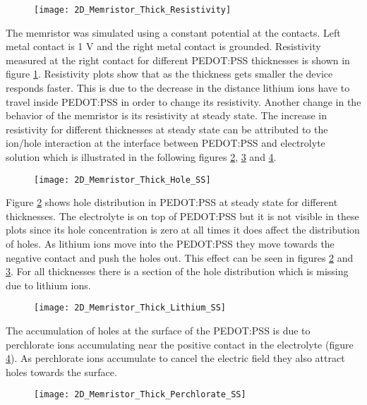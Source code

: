 \begin{doublespace}
\begin{figure}[!htp]
\centering
\texttt{[image: 2D\_Memristor\_Thick\_Resistivity]}
\caption{} 
\label{thick_resistivity}
\end{figure}

The memristor was simulated using a constant potential at the contacts. Left metal contact is 1 V and the right metal contact is grounded. Resistivity measured at the right contact for different PEDOT:PSS thicknesses is shown in figure \ref{thick_resistivity}. Resistivity plots show that as the thickness gets smaller the device responds faster. This is due to the decrease in the distance lithium ions have to travel inside PEDOT:PSS in order to change its resistivity. Another change in the behavior of the memristor is its resistivity at steady state. The increase in resistivity for different thicknesses at steady state can be attributed to the ion/hole interaction at the interface between PEDOT:PSS and electrolyte solution which is illustrated in the following figures \ref{thick_p_ss}, \ref{thick_li_ss} and \ref{thick_perch_ss}.

\begin{figure}[!htp]
\centering
\texttt{[image: 2D\_Memristor\_Thick\_Hole\_SS]}
\caption{} 
\label{thick_p_ss}
\end{figure}


Figure \ref{thick_p_ss} shows hole distribution in PEDOT:PSS at steady state for different thicknesses. The electrolyte is on top of PEDOT:PSS but it is not visible in these plots since its hole concentration is zero at all times it does affect the distribution of holes. As lithium ions move into the PEDOT:PSS they move towards the negative contact and push the holes out. This effect can be seen in figures \ref{thick_p_ss} and  \ref{thick_li_ss}. For all thicknesses there is a section of the hole distribution which is missing due to lithium ions.

\begin{figure}[!htp]
\centering
\texttt{[image: 2D\_Memristor\_Thick\_Lithium\_SS]}
\caption{} 
\label{thick_li_ss}
\end{figure}

The accumulation of holes at the surface of the PEDOT:PSS is due to perchlorate ions accumulating near the positive contact in the electrolyte (figure \ref{thick_perch_ss}). As perchlorate ions accumulate to cancel the electric field they also attract holes towards the surface.

\begin{figure}[!htp]
\centering
\texttt{[image: 2D\_Memristor\_Thick\_Perchlorate\_SS]}
\caption{} 
\label{thick_perch_ss}
\end{figure}


\end{doublespace}
